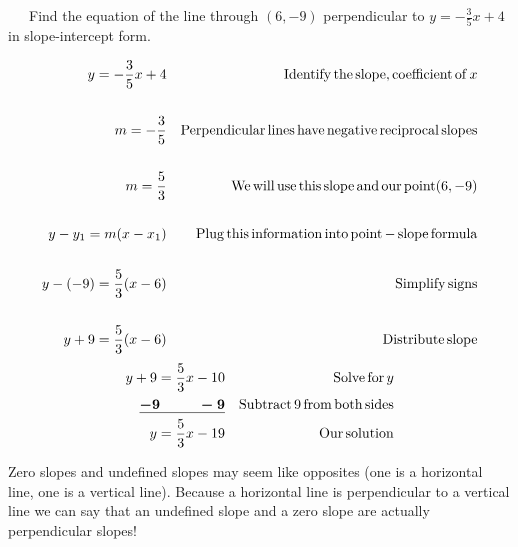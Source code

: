 \begin{example}\label{Lin72}~~~Find the equation of the line through $(6, - 9)$ perpendicular to $y = -
  \displaystyle\frac{3}{5} x + 4$ in slope-intercept form.
\end{example}
  \begin{eqnarray*}
    y = - \frac{3}{5} x + 4 &  & \operatorname{Identify} \operatorname{the} \operatorname{slope},
    \operatorname{coefficient} \operatorname{of} x\\
    &  & \\
    m = - \frac{3}{5} &  & \operatorname{Perpendicular} \operatorname{lines} \operatorname{have}
    \operatorname{negative} \operatorname{reciprocal} \operatorname{slopes}\\
    &  & \\
    m = \frac{5}{3} &  & \operatorname{We} \operatorname{will} \operatorname{use} \operatorname{this}
    \operatorname{slope} \operatorname{and} \operatorname{our} \operatorname{point} (6, - 9) \\
    &  & \\
    y - y_1 = m (x - x_1) &  & \operatorname{Plug} \operatorname{this} \operatorname{information}
    \operatorname{into} \operatorname{point} - \operatorname{slope} \operatorname{formula}\\
    &  & \\
    y - (- 9) = \frac{5}{3} (x - 6) &  & \operatorname{Simplify} \operatorname{signs}\\
    &  & \\
    y + 9 = \frac{5}{3} (x - 6) &  & \operatorname{Distribute} \operatorname{slope}
  \end{eqnarray*}
  \begin{eqnarray*}
    y + 9 = \frac{5}{3} x - 10 &  & \operatorname{Solve} \operatorname{for} y\\
    \boldsymbol{\underline{- 9 ~~~~~~~~- 9}} &  & \operatorname{Subtract} 9 \operatorname{from} \operatorname{both}
    \operatorname{sides}\\
    y = \frac{5}{3} x - 19 &  & \operatorname{Our} \operatorname{solution}
  \end{eqnarray*}

 Zero slopes and undefined slopes may seem like opposites (one is a horizontal line,
one is a vertical line). Because a horizontal line is perpendicular to a
vertical line we can say that an undefined slope and a zero slope are actually
perpendicular slopes!

